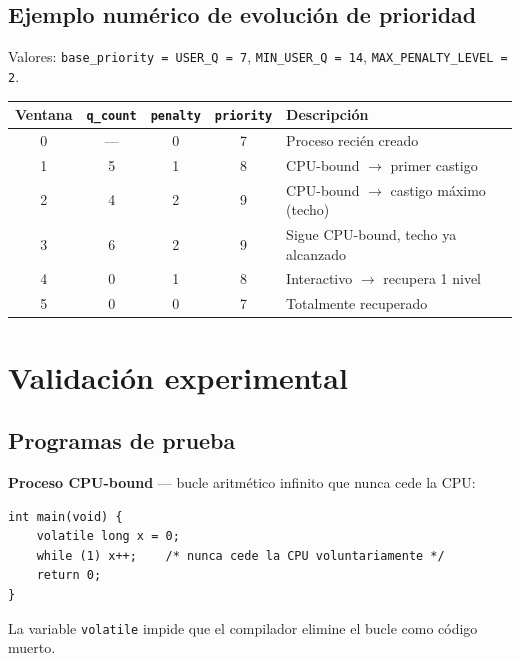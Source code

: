 \documentclass[11pt,a4paper]{article}
\begin{document}
\subsection{Ejemplo num\'erico de evoluci\'on de prioridad}

Valores: \texttt{base\_priority = USER\_Q = 7}, \texttt{MIN\_USER\_Q = 14},
\texttt{MAX\_PENALTY\_LEVEL = 2}.

\begin{center}
\begin{tabular}{ccccp{5cm}}
\toprule
\textbf{Ventana} & \textbf{\texttt{q\_count}} &
\textbf{\texttt{penalty}} & \textbf{\texttt{priority}} & \textbf{Descripci\'on} \\
\midrule
0 & ---& 0 & 7 & Proceso reci\'en creado \\
1 & 5  & 1 & 8 & CPU-bound $\to$ primer castigo \\
2 & 4  & 2 & 9 & CPU-bound $\to$ castigo m\'aximo (techo) \\
3 & 6  & 2 & 9 & Sigue CPU-bound, techo ya alcanzado \\
4 & 0  & 1 & 8 & Interactivo $\to$ recupera 1 nivel \\
5 & 0  & 0 & 7 & Totalmente recuperado \\
\bottomrule
\end{tabular}
\end{center}

\section{Validaci\'on experimental}

\subsection{Programas de prueba}

\noindent\textbf{Proceso CPU-bound} --- bucle aritm\'etico infinito que nunca cede la CPU:

\begin{lstlisting}[style=cstyle,caption={\texttt{cpu\_bound.c}}]
int main(void) {
    volatile long x = 0;
    while (1) x++;    /* nunca cede la CPU voluntariamente */
    return 0;
}
\end{lstlisting}

La variable \texttt{volatile} impide que el compilador elimine el bucle como c\'odigo
muerto.
\end{document}
